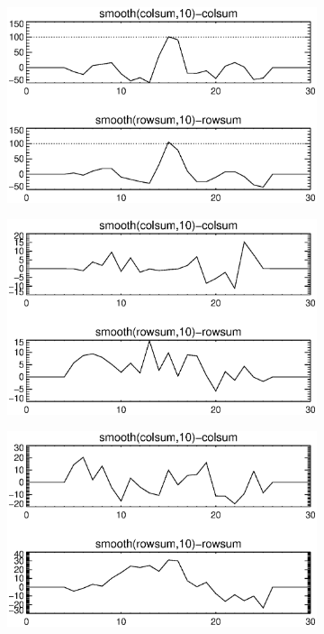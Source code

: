 \documentclass[10pt]{scrartcl}
\begin{document}
\begin{figure}[!ht]
    \begin{subfigure}[b]{.3\linewidth}
        \centering
        \includegraphics[width=1.0\linewidth]{../plots_tables_images/1d1dsums_1_1.eps}
    \end{subfigure}
    \begin{subfigure}[b]{.3\linewidth}
        \centering
        \includegraphics[width=1.0\linewidth]{../plots_tables_images/1d1dsums_1_9.eps}
    \end{subfigure}
    \begin{subfigure}[b]{.3\linewidth}
        \centering
        \includegraphics[width=1.0\linewidth]{../plots_tables_images/1d1dsums_2_0.eps}
    \end{subfigure}
\vspace{0.2in}


\end{figure}
\end{document}
